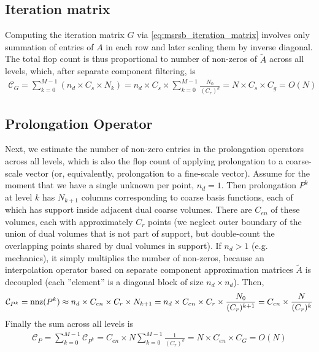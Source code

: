 \subsection{Iteration matrix}

Computing the iteration matrix $G$ via \cref{eq:msrsb_iteration_matrix} involves only summation of entries of $A$ in each row and later scaling them by inverse diagonal.   The total flop count is thus proportional to number of non-zeros of $\widetilde{A}$ across all levels, which, after separate component filtering, is
\begin{align}
    \mathcal{C}_G = \sum\limits_{k=0}^{M-1} (n_d \times C_s \times N_k) = n_d \times C_s \times \sum\limits_{k=0}^{M-1} \frac{N_0}{(C_r)^k} = N \times C_s \times C_g = O(N) \label{eq:complexity_iter_mat}
\end{align}

\subsection{Prolongation Operator}

Next, we estimate the number of non-zero entries in the prolongation operators across all levels, which is also the flop count of applying prolongation to a coarse-scale vector (or, equivalently, prolongation to a fine-scale vector).   Assume for the moment that we have a single unknown per point, $n_d = 1$.   Then prolongation $P^k$ at level $k$ has $N_{k+1}$ columns corresponding to coarse basis functions, each of which has support inside adjacent dual coarse volumes.   There are $C_{en}$ of these volumes, each with approximately $C_r$ points (we neglect outer boundary of the union of dual volumes that is not part of support, but double-count the overlapping points shared by dual volumes in support).   If $n_d > 1$ (e.g. mechanics), it simply multiplies the number of non-zeros, because an interpolation operator based on separate component approximation matrices $\widetilde{A}$ is decoupled (each ''element'' is a diagonal block of size $n_d \times n_d$).   Then,
\begin{align}
    \mathcal{C}_{P^k} = \operatorname{nnz}(P^k) \approx n_d \times C_{en} \times C_r \times N_{k+1} = n_d \times C_{en} \times C_r \times \frac{N_0}{(C_r)^{k+1}} = C_{en} \times \frac{N}{(C_r)^k} \label{eq:complexity_prolongation}
\end{align}
Finally the sum across all levels is
\begin{align}
    \mathcal{C}_{P} = \sum\limits_{k=0}^{M-1} \mathcal{C}_{P^k} = C_{en} \times N \sum\limits_{k=0}^{M-1}\frac{1}{(C_r)^k} = N \times C_{en} \times C_G = O(N) \label{eq:complexity_prolongation_all}
\end{align}

